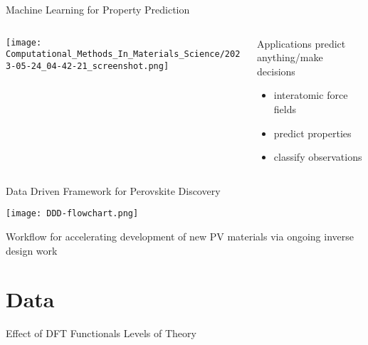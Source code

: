 \documentclass[10pt, aspectratio=169, presentation]{beamer}
\begin{document}
\begin{frame}[label={sec:org935614a}]{Machine Learning for Property Prediction}
\begin{columns}
\begin{column}{0.7\columnwidth}
\begin{center}
\texttt{[image: Computational\_Methods\_In\_Materials\_Science/2023-05-24\_04-42-21\_screenshot.png]}
\end{center}
\end{column}


\begin{column}{0.3\columnwidth}
\begin{block}{Applications}
predict anything/make decisions\autocite{pablo-2019-new-front}
\begin{itemize}
\item interatomic force fields
\item predict properties
\item classify observations
\end{itemize}
\end{block}
\end{column}
\end{columns}
\end{frame}

\begin{frame}[label={sec:org7af7803}]{Data Driven Framework for Perovskite Discovery}
\begin{center}
\texttt{[image: DDD-flowchart.png]}
\end{center}
\center{}\vspace{-0.75cm}Workflow for accelerating development of new PV materials
\autocite{yang-2023-high-throug}
via ongoing inverse design work
\autocite{yang-2023-discov-novel}
\end{frame}

\section{Data}
\label{sec:org4fbfe4c}
\begin{frame}[label={sec:org1213889}]{Effect of DFT Functionals Levels of Theory}
 
\begin{center}

\end{center}
\end{frame}
\end{document}
